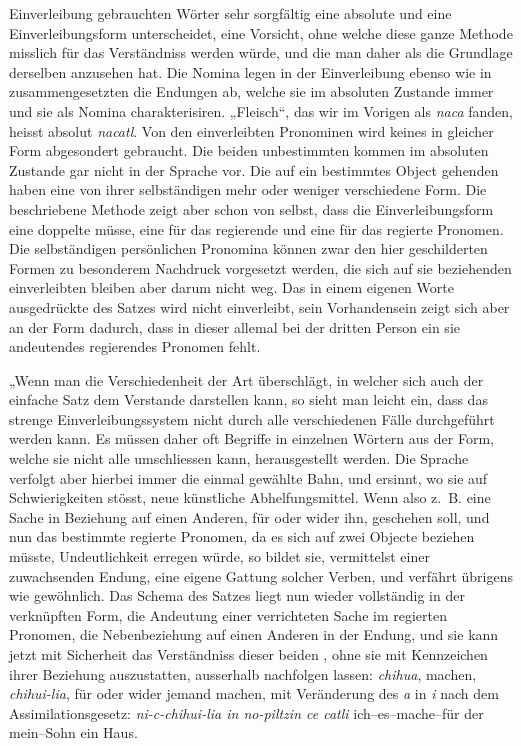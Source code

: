 Einverleibung gebrauchten Wörter sehr sorgfältig eine absolute und eine Einverleibungsform unterscheidet, eine Vorsicht, ohne welche diese ganze Methode misslich für das Verständniss werden würde, und die man daher als die Grundlage derselben anzusehen hat. Die Nomina legen in der Einverleibung ebenso wie in zusammengesetzten  die Endungen ab, welche sie im absoluten Zustande immer  und sie als Nomina charakterisiren. „Fleisch“, das wir im Vorigen als \textit{naca} fanden, heisst absolut \textit{nacatl}. Von den einverleibten Pronominen wird keines in gleicher Form abgesondert gebraucht. Die beiden unbestimmten kommen im absoluten Zustande gar nicht in der Sprache vor. Die auf ein bestimmtes Object gehenden haben eine von ihrer selbständigen mehr oder weniger verschiedene Form. Die beschriebene Methode zeigt aber schon von selbst, dass die Einverleibungsform eine doppelte  müsse, eine für das regierende und eine für das regierte Pronomen. Die selbständigen persönlichen Pronomina können zwar den hier geschilderten Formen zu besonderem Nachdruck vorgesetzt werden, die sich auf sie beziehenden einverleibten bleiben aber darum nicht weg. Das in einem eigenen Worte ausgedrückte \largerpage[2] des Satzes wird nicht einverleibt, sein Vorhandensein zeigt sich aber an der Form dadurch, dass in dieser allemal bei der dritten Person ein sie andeutendes regierendes Pronomen fehlt.

\label{sp.356}

„Wenn man die Verschiedenheit der Art überschlägt, in welcher sich auch der einfache Satz dem Verstande darstellen kann, so sieht man leicht ein, dass das strenge Einverleibungssystem nicht durch alle verschiedenen Fälle durchgeführt werden kann. Es müssen daher oft Begriffe in einzelnen Wörtern aus der Form, welche sie nicht alle umschliessen kann, herausgestellt werden. Die Sprache verfolgt aber hierbei immer die einmal gewählte Bahn, und ersinnt, wo sie auf Schwierigkeiten stösst, neue künstliche Abhelfungsmittel. Wenn also z.~B. eine Sache in Beziehung auf einen Anderen, für oder wider ihn, geschehen \label{fp.338} soll, und nun das bestimmte regierte Pronomen, da es sich auf zwei Objecte beziehen müsste, Undeutlichkeit erregen würde, so bildet sie, vermittelst einer zuwachsenden Endung, eine eigene Gattung solcher Verben, und verfährt übrigens wie \label{fp.207} gewöhnlich. Das Schema des Satzes liegt nun wieder vollständig in der verknüpften Form, die Andeutung einer verrichteten Sache im regierten Pronomen, die Nebenbeziehung auf einen Anderen in der Endung, und sie kann jetzt mit Sicherheit das Verständniss dieser beiden , ohne sie mit Kennzeichen ihrer Beziehung auszustatten, ausserhalb nachfolgen lassen: \textit{chihua}, machen, \textit{chihui-lia}, für oder wider jemand machen, mit Veränderung des \textit{a} in \textit{i} nach dem Assimilationsgesetz: \textit{ni-c-chihui-lia in no-piltzin ce catli} ich–es–mache–für der mein–Sohn ein Haus.

